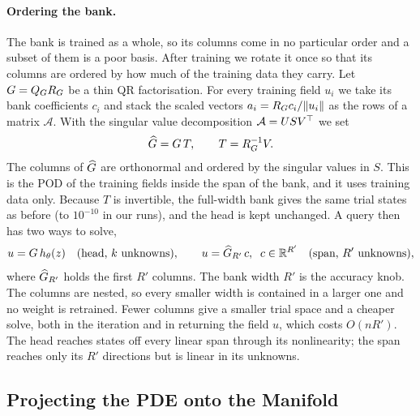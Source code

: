 \documentclass{article}
\begin{document}
\paragraph{Ordering the bank.}
\label{sec:method:ladder}\label{sec:method:ordered}
The bank is trained as a whole, so its columns come in no particular
order and a subset of them is a poor basis. After training we rotate it
once so that its columns are ordered by how much of the training data
they carry. Let $G=Q_G R_G$ be a thin QR factorisation. For every
training field $u_i$ we take its bank coefficients $c_i$ and stack the
scaled vectors $a_i=R_G c_i/\lVert u_i \rVert$ as the rows of a matrix $\mathcal
A$. With the singular value decomposition $\mathcal A=U S V^{\top}$ we set
\begin{equation}
  \widehat{G} = G\,T,
  \qquad
  T = R_G^{-1}V .
  \label{eq:ordered}
\end{equation}
The columns of $\widehat{G}$ are orthonormal and ordered by the
singular values in $S$. This is the POD of the training fields inside the
span of the bank, and it uses training data only. Because $T$ is
invertible, the full-width bank gives the same trial states as before (to
$10^{-10}$ in our runs), and the head is kept unchanged. A query then has
two ways to solve,
\begin{equation}
  u = G\,h_\theta(z)
  \quad(\text{head, $k$ unknowns}),
  \qquad
  u = \widehat{G}_{R'}\,c,\;\; c\in\mathbb{R}^{R'}
  \quad(\text{span, $R'$ unknowns}),
  \label{eq:modes}
\end{equation}
where $\widehat{G}_{R'}$ holds the first $R'$ columns. The bank width
$R'$ is the accuracy knob. The columns are nested, so every smaller width
is contained in a larger one and no weight is retrained. Fewer columns
give a smaller trial space and a cheaper solve, both in the iteration and
in returning the field $u$, which costs $O(nR')$. The head reaches states
off every linear span through its nonlinearity; the span reaches only its
$R'$ directions but is linear in its unknowns.

\subsection{Projecting the PDE onto the Manifold}
\label{sec:method:weak}
\end{document}
